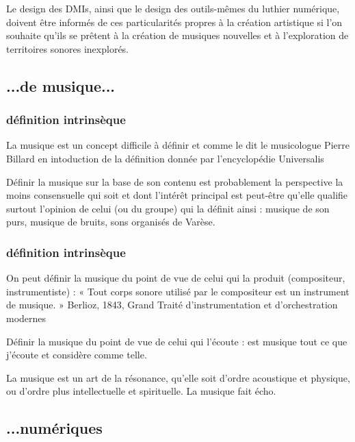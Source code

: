 
%
Le design des \glspl{DMI}, ainsi que le design des outils-mêmes du luthier numérique, doivent être informés de ces particularités propres à la création artistique si l'on souhaite qu'ils se prêtent à la création de musiques nouvelles et à l'exploration de territoires sonores inexplorés.


\subsection*{...de musique...} 
\subsubsection*{définition intrinsèque}
La musique est un concept difficile à définir et comme le dit le musicologue Pierre Billard en intoduction de la définition donnée par l'encyclopédie Universalis 

Définir la musique sur la base de son contenu est probablement la perspective la moins consensuelle qui soit et dont l'intérêt principal est peut-être qu'elle qualifie surtout l'opinion de celui (ou du groupe) qui la définit ainsi : musique de son purs, musique de bruits, sons organisés de Varèse.
\subsubsection*{définition intrinsèque}

On peut définir la musique du point de vue de celui qui la produit (compositeur, instrumentiste) : « Tout corps sonore utilisé par le compositeur est un instrument de musique. » Berlioz, 1843, Grand Traité d'instrumentation et d'orchestration modernes

Définir la musique du point de vue de celui qui l'écoute : est musique tout ce que j'écoute et considère comme telle.

La musique est un art de la résonance, qu'elle soit d'ordre acoustique et physique, ou d'ordre plus intellectuelle et spirituelle. La musique fait écho.

\subsection*{...numériques}

